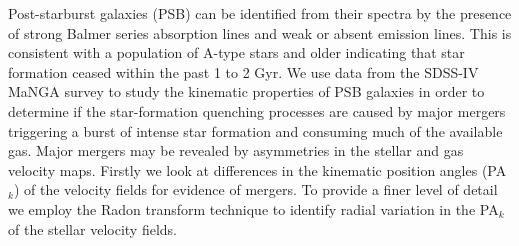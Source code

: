
Post-starburst galaxies (PSB) can be identified from their spectra by the presence of strong Balmer series absorption lines and weak or absent emission lines. This is consistent with a population of A-type stars and older indicating that star formation ceased within the past 1 to 2 Gyr. We use data from the SDSS-IV MaNGA survey to study the kinematic properties of PSB galaxies in order to determine if the star-formation quenching processes are caused by major mergers triggering a burst of intense star formation and consuming much of the available gas. Major mergers may be revealed by asymmetries in the stellar and gas velocity maps. Firstly we look at differences in the kinematic position angles (PA$_{k}$) of the velocity fields for evidence of mergers. To provide a finer level of detail we employ the Radon transform technique to identify radial variation in the PA$_{k}$ of the stellar velocity fields.


